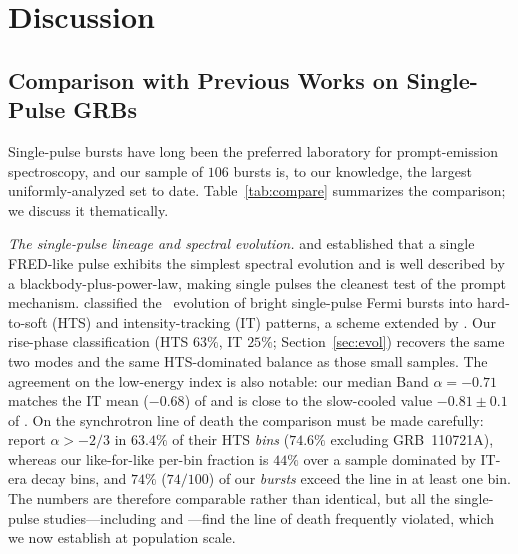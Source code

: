 \section{Discussion} \label{sec:discussion}
\subsection{Comparison with Previous Works on Single-Pulse GRBs}
\label{sec:disc-compare}
Single-pulse bursts have long been the preferred laboratory for prompt-emission
spectroscopy, and our sample of $106$ bursts is, to our knowledge, the largest
uniformly-analyzed set to date. Table~\ref{tab:compare} summarizes the
comparison; we discuss it thematically.

\emph{The single-pulse lineage and spectral evolution.}
\citet{Ryde2004} and \citet{RydePeer2009} established that a single FRED-like
pulse exhibits the simplest spectral evolution and is well described by a
blackbody-plus-power-law, making single pulses the cleanest test of the prompt
mechanism. \citet{Lu2012} classified the \Ep\ evolution of bright single-pulse
Fermi bursts into hard-to-soft (HTS) and intensity-tracking (IT) patterns, a
scheme extended by \citet{Basak2013,Basak2014}. Our rise-phase classification
(HTS $63\%$, IT $25\%$; Section~\ref{sec:evol}) recovers the same two modes and
the same HTS-dominated balance as those small samples. The agreement on the
low-energy index is also notable: our median Band $\alpha=-0.71$ matches the IT
mean ($-0.68$) of \citet{Basak2014} and is close to the slow-cooled value
$-0.81\pm0.1$ of \citet{Burgess2014b}. On the synchrotron line of death the
comparison must be made carefully: \citet{Basak2014} report $\alpha>-2/3$ in
$63.4\%$ of their HTS \emph{bins} ($74.6\%$ excluding GRB~110721A), whereas our
like-for-like per-bin fraction is $44\%$ over a sample dominated by IT-era
decay bins, and $74\%$ ($74/100$) of our \emph{bursts} exceed the line in at
least one bin. The numbers are therefore comparable rather than identical, but
all the single-pulse studies---including \citet{Basak2013} and
\citet{Guiriec2010}---find the line of death frequently violated, which we now
establish at population scale.

